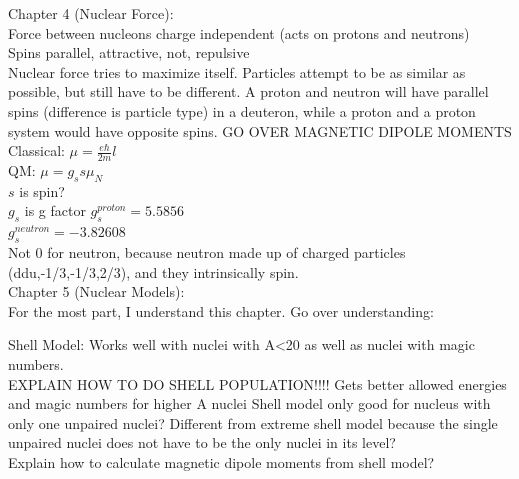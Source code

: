 \documentclass{article}
\begin{document}
\begin{multicols}{3}
Chapter 4 (Nuclear Force):\\
Force between nucleons charge independent (acts on protons and neutrons)\\
Spins parallel, attractive, not, repulsive\\
Nuclear force tries to maximize itself.  Particles attempt to be as similar as possible, but still have to be different.  A proton and neutron will have parallel spins (difference is particle type) in a deuteron, while a proton and a proton system would have opposite spins.
GO OVER MAGNETIC DIPOLE MOMENTS\\
Classical: $\mu = \frac{e \hbar}{2 m} l $\\
QM: $\mu = g_{s}s\mu_{N}$\\
\hspace*{0.01\textwidth} $s$ is spin?\\
\hspace*{0.01\textwidth} $g_{s}$ is g factor
\hspace*{0.01\textwidth} $g_{s}^{proton} = 5.5856$\\
\hspace*{0.01\textwidth} $g_{s}^{neutron} = -3.82608$\\
\hspace*{0.01\textwidth} Not 0 for neutron, because neutron made up of charged particles (ddu,-1/3,-1/3,2/3), and they intrinsically spin.\\

Chapter 5 (Nuclear Models):\\

For the most part, I understand this chapter.  Go over understanding:

Shell Model: Works well with nuclei with A<20 as well as nuclei with magic numbers.\\
\hspace*{0.01\textwidth} EXPLAIN HOW TO DO SHELL POPULATION!!!!
\hspace*{0.01\textwidth} Gets better allowed energies and magic 
\hspace*{0.01\textwidth} numbers for higher A nuclei
\hspace*{0.01\textwidth} Shell model only good for nucleus with only one unpaired nuclei?  Different from extreme shell model because the single unpaired nuclei does not have to be the only nuclei in its level?\\
\hspace*{0.01\textwidth} Explain how to calculate magnetic dipole moments from shell model?


\end{multicols}
\end{document}
